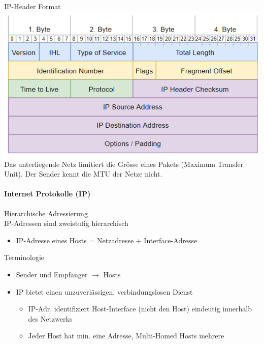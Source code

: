 \begin{KR}{IP-Header Format}
        \includegraphics[width=1\linewidth]{images/internet_protokoll_format_ip.png}\\
    {\footnotesize Das unterliegende Netz limitiert die Grösse eines Pakets (Maximum Transfer Unit). Der Sender kennt die MTU der Netze nicht.}
\end{KR}

\paragraph{Internet Protokolle (IP)}

\begin{definition}{Hierarchische Adressierung}\\
IP-Adressen sind zweistufig hierarchisch
\begin{itemize}
    \item IP-Adresse eines Hosts = Netzadresse + Interface-Adresse
\end{itemize}
\end{definition}

\begin{definition}{Terminologie}
    \begin{itemize}
        \item Sender und Empfänger $\rightarrow$ Hosts
        \item IP bietet einen unzuverlässigen, verbindungslosen Dienst
        \begin{itemize}
            \item IP-Adr. identifiziert Host-Interface (nicht den Host) eindeutig innerhalb des Netzwerks
            \item Jeder Host hat min. eine Adresse, Multi-Homed Hosts mehrere
        \end{itemize}
    \end{itemize}
\end{definition}

